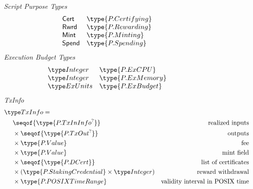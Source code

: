 \begin{figure*}[htb]
  \emph{Script Purpose Types} \\
  \begin{equation*}
    \begin{array}{l@{~~~}l}
      \mathsf{Cert} & \type{P.Certifying} \\
      \mathsf{Rwrd} & \type{P.Rewarding} \\
      \mathsf{Mint} & \type{P.Minting} \\
      \mathsf{Spend} & \type{P.Spending} \\
    \end{array}
  \end{equation*}
  \emph{Execution Budget Types} \\
  \begin{equation*}
    \begin{array}{l@{~~~}l}
      \Integer & \type{P.ExCPU} \\
      \Integer  & \type{P.ExMemory}\\
      \ExUnits & \type{P.ExBudget}  \\
    \end{array}
  \end{equation*}
  \emph{TxInfo} \\
    \begin{align*}
    & \TxInfo = \\
      & ~~~~ \seqof{\type{P.TxInInfo^?}}  %
      & \text{realized inputs} \\
      & ~~~~ \times \seqof{\type{P.TxOut^?}}
      & \text{outputs} \\ %
      & ~~~~ \times \type{P.Value}
      & \text{fee} \\ %
      & ~~~~ \times \type{P.Value}
      & \text{mint field} \\ %
      & ~~~~ \times \seqof{\type{P.DCert}}
      & \text{list of certificates} \\ %
      & ~~~~ \times (\type{P.StakingCredential} \times \Integer)
      & \text{reward withdrawal} \\ %
      & ~~~~ \times \type{P.POSIXTimeRange}
      & \text{validity interval in POSIX time} \\ %

\end{align*}
\end{figure*}
